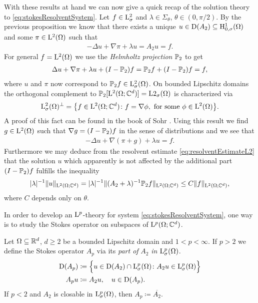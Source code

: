 With these results at hand we can now give a quick recap of the solution theory to \eqref{eq:stokesResolventSystem}.
Let $f \in \mathrm{L}^2_\sigma$ and $\lambda \in \Sigma_\theta$, $\theta \in (0, \pi/2)$.
By the previous proposition we know that there exists a unique $u \in \mathrm{D}(A_2) \subseteq \mathrm{H}^1_{0,\sigma}(\Omega)$ and some $\pi \in \mathrm{L}^2(\Omega)$ such that
\begin{align*}
  -\Delta u + \nabla \pi + \lambda u = A_2 u = f.
\end{align*}
For general $f = \mathrm{L}^2(\Omega)$ we use the \emph{Helmholtz projection} $\mathbb{P}_2$ to get
\begin{align*}
  \Delta u + \nabla \pi + \lambda u + (I - \mathbb{P}_2) f = \mathbb{P}_2 f + (I - \mathbb{P}_2) f = f,
\end{align*}
where $u$ and $\pi$ now correspond to $\mathbb{P}_2 f \in \mathrm{L}^2_\sigma(\Omega)$. On bounded Lipschitz domains the orthogonal complement to $\mathbb{P}_2[\mathrm{L}^2(\Omega; \mathbb{C}^d)] = \mathrm{L}2_\sigma(\Omega)$ is characterized via
\begin{align*}
  \mathrm{L}^2_\sigma(\Omega)^\perp = \big\{ f \in \mathrm{L}^2(\Omega; \mathbb{C}^d) \colon f = \nabla \phi, \text{ for some } \phi \in \mathrm{L}^2(\Omega) \big\}.
\end{align*}
A proof of this fact can be found in the book of Sohr \cite[Lemma 2.5.3]{sohr}.
Using this result we find $g \in \mathrm{L}^2(\Omega)$ such that $\nabla g = (I - \mathbb{P}_2)f$ in the sense of distributions and we see that
\begin{align*}
  -\Delta u + \nabla( \pi + g ) + \lambda u = f.
\end{align*}
Furthermore we may deduce from the resolvent estimate \eqref{eq:resolventEstimateL2} that the solution $u$ which apparently is not affected by the additional part $(I-\mathbb{P}_2)f$ fulfills the inequality
\begin{align*}
  |\lambda|^{-1} \| u\|_{\mathrm{L}^2(\Omega; \mathbb{C}^d)} = |\lambda|^{-1} \|(A_2 + \lambda)^{-1} \mathbb{P}_2 f \|_{\mathrm{L}^2(\Omega; \mathbb{C}^d)} \leq C \| f \|_{\mathrm{L}^2(\Omega; \mathbb{C}^d)},
\end{align*}
where $C$ depends only on $\theta$.

In order to develop an $\mathrm{L}^p$-theory for system \eqref{eq:stokesResolventSystem}, one way is to study the Stokes operator on subspaces of $\mathrm{L}^p(\Omega; \mathbb{C}^d)$. 

\begin{defn}
  Let $\Omega \subseteq \mathbb{R}^d$, $d \geq 2$ be a bounded Lipschitz domain and $1 < p < \infty$.
  If $p > 2$ we define the Stokes operator $A_p$ via its \emph{part of } $A_2$ \emph{in } $\mathrm{L}^p_\sigma(\Omega)$.
  \begin{align*}
    \mathrm{D}(A_p) &\coloneqq \Big\{ u \in \mathrm{D}(A_2) \cap \mathrm{L}^p_\sigma(\Omega) \colon A_2 u \in \mathrm{L}^p_\sigma(\Omega) \Big\} \\
    A_p u &\coloneqq A_2 u, \quad u \in \mathrm{D}(A_p).
  \end{align*}
  If $p < 2$ and $A_2$ is closable in $\mathrm{L}^p_\sigma(\Omega)$, then $A_p \coloneqq \overline{A_2}$.
\end{defn}
